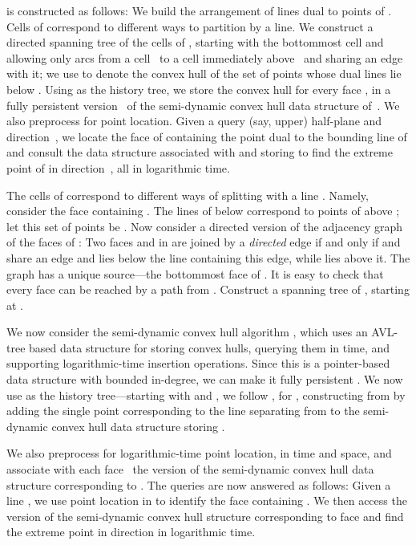 \documentclass{llncs}
\begin{document}
 is constructed as follows: We build the arrangement
 of lines dual to points of .  Cells of  correspond
to different ways to partition  by a line.  We construct a directed
spanning tree  of the cells of , starting with the bottommost
cell and allowing only arcs from a cell~ to a cell immediately
above~ and sharing an edge with it; we use  to denote
the convex hull of the set of points whose dual lines lie below .  Using  as the
history tree, we store the convex hull  for every face , in a fully persistent version~\cite{Bob} of the semi-dynamic
convex hull data structure of~\cite{Preparata}.  We also preprocess
 for point location.  Given a query (say, upper) half-plane  and
direction~, we locate the face  of  containing the point
dual to the bounding line of  and consult the data structure
associated with  and storing  to find the extreme
point of  in direction~, all in logarithmic time.  


\iffalse
The cells of 
correspond to different ways of splitting  with a line .
Namely, consider the face  containing .  The lines
of  below  correspond to points of  above ; let this
set of points be .
Now consider a directed version  of
the adjacency graph of the faces of : Two faces  and  in
 are joined by a \emph{directed} edge  if and only if 
and  share an edge and  lies below the line containing this
edge, while  lies above it.  The graph  has a unique
source---the bottommost face  of .  It is easy to
check that every face can be reached by a path from .
Construct a spanning tree  of , starting at . 

We now consider the semi-dynamic convex hull algorithm
\cite{Preparata}, which uses an AVL-tree based data structure for
storing convex hulls, querying them in  time, and
supporting logarithmic-time insertion operations.  Since this is a
pointer-based data structure with bounded in-degree, we can make it
fully persistent \cite{Bob}.  We now use  as the history
tree---starting with  and ,
we follow , for , constructing  from  by
adding the single point corresponding to the line separating  from
 to the semi-dynamic convex hull data structure storing . 

We also preprocess  for logarithmic-time point location, in
 time and  space, and associate with each face~
the version of the semi-dynamic convex hull data structure
corresponding to .  The queries are now answered as follows:
Given a line , we use point location in  to identify the
face  containing .  We then access the version of the
semi-dynamic convex hull structure  corresponding to face
 and find the extreme point in direction  in logarithmic
time.
\end{document}
